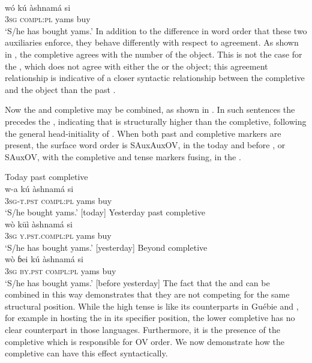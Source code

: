\documentclass[output=paper,newtxmath,modfonts,nonflat,draftmode]{langsci/langscibook}
\begin{document}
	\\
\gll wó  kú àshnamá si \\
3\textsc{sg} \textsc{compl:pl} yams buy \\
\glt `S/he has bought yams.' \hfill \citep[][56]{hyman1970}
\z
\z
In addition to the difference in word order that these two auxiliaries enforce, they behave differently with respect to agreement. As shown in , the completive  agrees with the number of the object. This is not the case for the  , which does not agree with either the  or the object; this agreement relationship is indicative of a closer syntactic relationship between the completive and the object than the past .

Now the   and completive  may be combined, as shown in . In such sentences the  precedes the , indicating that  is structurally higher than the completive, following the general head-initiality of  . When both past and completive markers are present, the surface word order is SAuxAuxOV, in the today and before , or SAuxOV, with the completive and tense markers fusing, in the .

\ea \label{ex:14:gwari}
\ea \label{ex:14a:gwari} {Today past completive}	\\
\gll w-a kú àshnamá si  \\
3\textsc{sg}-\textsc{t.pst} \textsc{compl:pl} yams buy \\
\glt `S/he bought yams.' [today] \hfill \citep[][57]{hyman1970}
\ex \label{ex:14b:gwari} {Yesterday past completive}	\\
\gll wò  k\=uì àshnamá si  \\
3\textsc{sg} \textsc{y.pst}.\textsc{compl:pl} yams buy \\
\glt `S/he has bought yams.' [yesterday] \hfill \citep[][57]{hyman1970}
\ex \label{ex:14c:gwari}{Beyond  completive}	\\
\gll wò {ɓei} kú àshnamá si  \\
3\textsc{sg} \textsc{by.pst} \textsc{compl:pl} yams buy \\
\glt `S/he has bought yams.' [before yesterday] \hfill \citep[][57]{hyman1970}
\z
\z
The fact that the  and  can be combined in this way demonstrates that they are not competing for the same structural position. While the high tense  is like its  counterparts in Guébie and , for example in hosting the  in its specifier position, the lower completive  has no clear counterpart in those languages. Furthermore, it is the presence of the completive which is responsible for OV order. We now demonstrate how the completive can have this effect syntactically.
\end{document}

